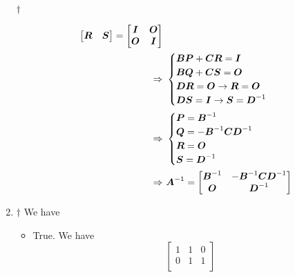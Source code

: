 \documentclass[a4paper,12pt]{article}
\begin{document}
\begin{enumerate}
\begin{answer}{$\dag$}
\begin{itemize}
\begin{equation}
\begin{aligned}
\begin{bmatrix}
                        \boldsymbol{R} & \boldsymbol{S}
                    \end{bmatrix} = \begin{bmatrix}
                        \boldsymbol{I} & \boldsymbol{O} \\
                        \boldsymbol{O} & \boldsymbol{I}
                    \end{bmatrix} \\
                    \Rightarrow & \ \begin{cases}
                        \boldsymbol{BP} + \boldsymbol{CR} = \boldsymbol{I} \\
                        \boldsymbol{BQ} + \boldsymbol{CS} = \boldsymbol{O} \\
                        \boldsymbol{DR} = \boldsymbol{O} \rightarrow \boldsymbol{R} = \boldsymbol{O} \\
                        \boldsymbol{DS} = \boldsymbol{I} \rightarrow \boldsymbol{S} = \boldsymbol{D}^{-1}
                    \end{cases} \\
                    \Rightarrow & \ \begin{cases}
                        \boldsymbol{P} = \boldsymbol{B}^{-1} \\
                        \boldsymbol{Q} = -\boldsymbol{B}^{-1}\boldsymbol{CD}^{-1} \\
                        \boldsymbol{R} = \boldsymbol{O} \\
                        \boldsymbol{S} = \boldsymbol{D}^{-1}
                    \end{cases} \\
                    \Rightarrow & \ \boldsymbol{A}^{-1} = \begin{bmatrix}
                        \boldsymbol{B}^{-1} & -\boldsymbol{B}^{-1}\boldsymbol{CD}^{-1} \\
                        \boldsymbol{O} & \boldsymbol{D}^{-1}
                    \end{bmatrix}
                \end{aligned}
            \end{equation}
        \end{itemize}
    \end{answer}
    \item \begin{answer}{$\dag$} We have 
        \begin{itemize}
            \item True. We have \begin{equation}
                \begin{bmatrix}
                    1 & 1 & 0 \\
                    0 & 1 & 1 \\

\end{bmatrix}
\end{equation}
\end{itemize}
\end{answer}
\end{enumerate}
\end{document}
